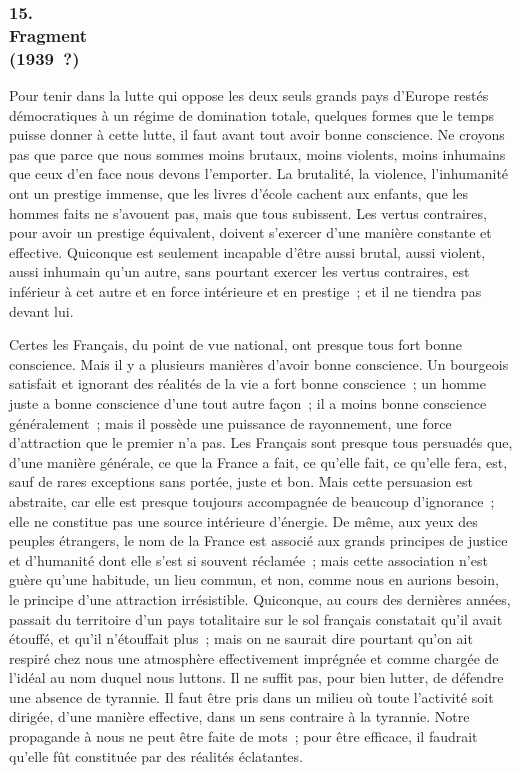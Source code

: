 \documentclass[french,twoside]{book} %
\begin{document}
\subsubsection[15. Fragment, (1939 ?)]{15. \\
Fragment \\
(1939 ?)}
\noindent \par
Pour tenir dans la lutte qui oppose les deux seuls grands pays d'Europe restés démocratiques à un régime de domination totale, quelques formes que le temps puisse donner à cette lutte, il faut avant tout avoir bonne conscience. Ne croyons pas que parce que nous sommes moins brutaux, moins violents, moins inhumains que ceux d'en face nous devons l'emporter. La brutalité, la violence, l'inhumanité ont un prestige immense, que les livres d'école cachent aux enfants, que les hommes faits ne s'avouent pas, mais que tous subissent. Les vertus contraires, pour avoir un prestige équivalent, doivent s'exercer d'une manière constante et effective. Quiconque est seulement incapable d'être aussi brutal, aussi violent, aussi inhumain qu'un autre, sans pourtant exercer les vertus contraires, est inférieur à cet autre et en force intérieure et en prestige ; et il ne tiendra pas devant lui.\par
Certes les Français, du point de vue national, ont presque tous fort bonne conscience. Mais il y a plusieurs manières d'avoir bonne conscience. Un bourgeois satisfait et ignorant des réalités de la vie a fort bonne conscience ; un homme juste a bonne conscience d'une tout autre façon ; il a moins bonne conscience généralement ; mais il possède une puissance de rayonnement, une force d'attraction que le premier n'a pas. Les Français sont presque tous persuadés que, d'une manière générale, ce que la France a fait, ce qu'elle fait, ce qu'elle fera, est, sauf de rares exceptions sans portée, juste et bon. Mais cette persuasion est abstraite, car elle est presque toujours accompagnée de beaucoup d'ignorance ; elle ne constitue pas une source intérieure d'énergie. De même, aux yeux des peuples étrangers, le nom de la France est associé aux grands principes de justice et d'humanité dont elle s'est si souvent réclamée ; mais cette association n'est guère qu'une habitude, un lieu commun, et non, comme nous en aurions besoin, le principe d'une attraction irrésistible. Quiconque, au cours des dernières années, passait du territoire d'un pays totalitaire sur le sol français constatait qu'il avait étouffé, et qu'il n'étouffait plus ; mais on ne saurait dire pourtant qu'on ait respiré chez nous une atmosphère effectivement imprégnée et comme chargée de l'idéal au nom duquel nous luttons. Il ne suffit pas, pour bien lutter, de défendre une absence de tyrannie. Il faut être pris dans un milieu où toute l'activité soit dirigée, d'une manière effective, dans un sens contraire à la tyrannie. Notre propa­gande à nous ne peut être faite de mots ; pour être efficace, il faudrait qu'elle fût constituée par des réalités éclatantes.\par
\end{document}
